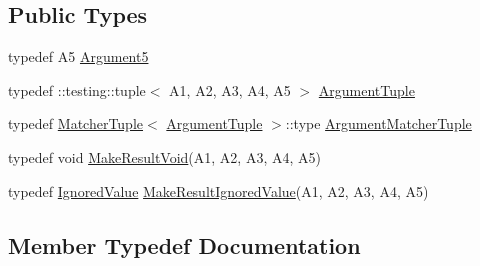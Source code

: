 \subsection*{Public Types}
\begin{DoxyCompactItemize}
\item 
typedef A5 \hyperlink{structtesting_1_1internal_1_1_function_3_01_r_07_a1_00_01_a2_00_01_a3_00_01_a4_00_01_a5_08_4_a5bc0279c43aa98c409219dee1b815c71}{Argument5}
\item 
typedef \+::testing\+::tuple$<$ A1, A2, A3, A4, A5 $>$ \hyperlink{structtesting_1_1internal_1_1_function_3_01_r_07_a1_00_01_a2_00_01_a3_00_01_a4_00_01_a5_08_4_af5a1487829347eae2a48b2f66f216f52}{Argument\+Tuple}
\item 
typedef \hyperlink{structtesting_1_1internal_1_1_matcher_tuple}{Matcher\+Tuple}$<$ \hyperlink{structtesting_1_1internal_1_1_function_3_01_r_07_08_4_ad483c3128c470d8cdb55c3ac1c575c11}{Argument\+Tuple} $>$\+::type \hyperlink{structtesting_1_1internal_1_1_function_3_01_r_07_a1_00_01_a2_00_01_a3_00_01_a4_00_01_a5_08_4_a03c18380538e53141227afe6d0f20cc8}{Argument\+Matcher\+Tuple}
\item 
typedef void \hyperlink{structtesting_1_1internal_1_1_function_3_01_r_07_a1_00_01_a2_00_01_a3_00_01_a4_00_01_a5_08_4_a2903acde18de33d756eef4d43d843c04}{Make\+Result\+Void}(A1, A2, A3, A4, A5)
\item 
typedef \hyperlink{classtesting_1_1internal_1_1_ignored_value}{Ignored\+Value} \hyperlink{structtesting_1_1internal_1_1_function_3_01_r_07_a1_00_01_a2_00_01_a3_00_01_a4_00_01_a5_08_4_a552ce4ec27e2d09fa1c133c66f72d7b3}{Make\+Result\+Ignored\+Value}(A1, A2, A3, A4, A5)
\end{DoxyCompactItemize}


\subsection{Member Typedef Documentation}
